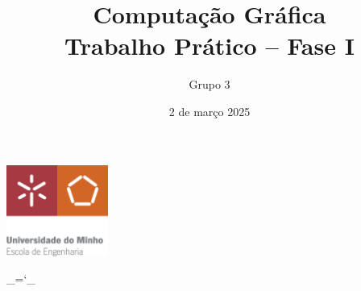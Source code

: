 \documentclass[12pt, a4paper]{article}
\title{\Huge \textbf{Computação Gráfica \\ \Large Trabalho Prático -- Fase I}}
\date{2 de março 2025}
\author{Grupo 3}
\begin{document}
\begin{center}
    \includegraphics[width=0.25\textwidth]{res/cover/EE-C.eps}
\end{center}

\chardef\_=`_
\onehalfspacing
\setlength{\parskip}{\baselineskip}
\setlength{\parindent}{0pt}
\def\arraystretch{1.5}

{\let\newpage\relax\maketitle}
\maketitle
\thispagestyle{empty}

\vspace*{\fill}
\end{document}
